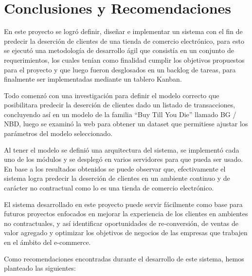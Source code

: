 
\chapter{Conclusiones y Recomendaciones}

En este proyecto se logró definir, diseñar e implementar un sistema con el fin de predecir la deserción de clientes de una tienda de comercio electrónico, para esto se ejecutó una metodología de desarrollo ágil que consistía en un conjunto de requerimientos, los cuales tenían como finalidad cumplir los objetivos propuestos para el proyecto y que luego fueron desglosados en un backlog de tareas, para finalmente ser implementadas mediante un tablero Kanban.

	Todo comenzó con una investigación para definir el modelo correcto que posibilitara predecir la deserción de clientes dado un listado de transacciones, concluyendo así en un modelo de la familia “Buy Till You Die” llamado BG / NBD, luego se examinó la web para obtener un dataset que permitiese ajustar los parámetros  del modelo seleccionado.

	Al tener el modelo se definió una arquitectura del sistema, se implementó cada uno de los módulos y se desplegó en varios servidores para que pueda ser usado. En base a los resultados obtenidos se puede observar que, efectivamente el sistema logra predecir la deserción de clientes en un ambiente continuo y de carácter no contractual como lo es una tienda de comercio electrónico.

	El sistema desarrollado en este proyecto puede servir fácilmente como base para futuros proyectos enfocados en mejorar la experiencia de los clientes en ambientes no contractuales, y así  identificar oportunidades de re-conversión, de ventas de valor agregado y optimizar los objetivos de negocios de las empresas que trabajen en el ámbito del e-commerce.
	
	Como recomendaciones encontradas durante el desarrollo de este sistema, hemos planteado las siguientes:

